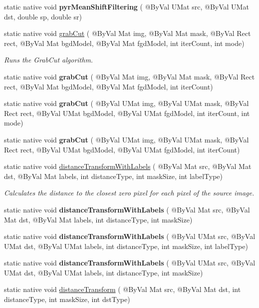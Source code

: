 \begin{DoxyCompactItemize}
\item 
static native void {\bfseries pyr\+Mean\+Shift\+Filtering} ( @By\+Val U\+Mat src, @By\+Val U\+Mat dst, double sp, double sr)
\item 
static native void \hyperlink{group__imgproc__misc_gaa33f53e9a934a40de2e80d2cec508ba2}{grab\+Cut} ( @By\+Val Mat img, @By\+Val Mat mask, @By\+Val Rect rect, @By\+Val Mat bgd\+Model, @By\+Val Mat fgd\+Model, int iter\+Count, int mode)
\begin{DoxyCompactList}\small\item\em Runs the Grab\+Cut algorithm. \end{DoxyCompactList}\item 
static native void {\bfseries grab\+Cut} ( @By\+Val Mat img, @By\+Val Mat mask, @By\+Val Rect rect, @By\+Val Mat bgd\+Model, @By\+Val Mat fgd\+Model, int iter\+Count)
\item 
static native void {\bfseries grab\+Cut} ( @By\+Val U\+Mat img, @By\+Val U\+Mat mask, @By\+Val Rect rect, @By\+Val U\+Mat bgd\+Model, @By\+Val U\+Mat fgd\+Model, int iter\+Count, int mode)
\item 
static native void {\bfseries grab\+Cut} ( @By\+Val U\+Mat img, @By\+Val U\+Mat mask, @By\+Val Rect rect, @By\+Val U\+Mat bgd\+Model, @By\+Val U\+Mat fgd\+Model, int iter\+Count)
\item 
static native void \hyperlink{group__imgproc__misc_gaaaf8e9c28cfa3aa0fba026897d9ad6d8}{distance\+Transform\+With\+Labels} ( @By\+Val Mat src, @By\+Val Mat dst, @By\+Val Mat labels, int distance\+Type, int mask\+Size, int label\+Type)
\begin{DoxyCompactList}\small\item\em Calculates the distance to the closest zero pixel for each pixel of the source image. \end{DoxyCompactList}\item 
static native void {\bfseries distance\+Transform\+With\+Labels} ( @By\+Val Mat src, @By\+Val Mat dst, @By\+Val Mat labels, int distance\+Type, int mask\+Size)
\item 
static native void {\bfseries distance\+Transform\+With\+Labels} ( @By\+Val U\+Mat src, @By\+Val U\+Mat dst, @By\+Val U\+Mat labels, int distance\+Type, int mask\+Size, int label\+Type)
\item 
static native void {\bfseries distance\+Transform\+With\+Labels} ( @By\+Val U\+Mat src, @By\+Val U\+Mat dst, @By\+Val U\+Mat labels, int distance\+Type, int mask\+Size)
\item 
static native void \hyperlink{group__imgproc__misc_ga8d767320bf0a4f3bbeebe751dbd2f3d7}{distance\+Transform} ( @By\+Val Mat src, @By\+Val Mat dst, int distance\+Type, int mask\+Size, int dst\+Type)

\end{DoxyCompactItemize}
